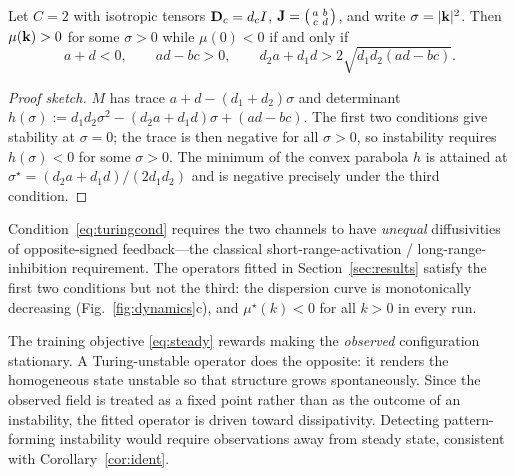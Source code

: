 \begin{proposition}
\label{prop:twochannel}
Let $C=2$ with isotropic tensors $\mathbf{D}_c = d_c I$, $\mathbf{J} = \begin{psmallmatrix}
a & b \\ c & d\end{psmallmatrix}$, and write $\sigma=|\mathbf{k}|^2$. Then
$\mu(\mathbf{k})>0$ for some $\sigma>0$ while $\mu(0)<0$ if and only if
\begin{equation}
a+d<0, \qquad ad-bc>0, \qquad d_2 a + d_1 d > 2\sqrt{d_1 d_2 (ad-bc)} .
\label{eq:turingcond}
\end{equation}
\end{proposition}

\begin{proof}[Proof sketch]
$M$ has trace $a+d-(d_1+d_2)\sigma$ and determinant
$h(\sigma) := d_1d_2\sigma^2 - (d_2a+d_1d)\sigma + (ad-bc)$. The first two
conditions give stability at $\sigma=0$; the trace is then negative for all
$\sigma>0$, so instability requires $h(\sigma)<0$ for some $\sigma>0$. The
minimum of the convex parabola $h$ is attained at
$\sigma^\star=(d_2a+d_1d)/(2d_1d_2)$ and is negative precisely under the third
condition.
\end{proof}

Condition~\eqref{eq:turingcond} requires the two channels to have
\emph{unequal} diffusivities of opposite-signed feedback---the classical
short-range-activation / long-range-inhibition requirement. The operators fitted
in Section~\ref{sec:results} satisfy the first two conditions but not the third:
the dispersion curve is monotonically decreasing
(Fig.~\ref{fig:dynamics}c), and $\mu^\star(k)<0$ for all $k>0$ in every run.

\begin{remark}
The training objective \eqref{eq:steady} rewards making the \emph{observed}
configuration stationary. A Turing-unstable operator does the opposite: it
renders the homogeneous state unstable so that structure grows spontaneously.
Since the observed field is treated as a fixed point rather than as the outcome
of an instability, the fitted operator is driven toward dissipativity. Detecting
pattern-forming instability would require observations away from steady state,
consistent with Corollary~\ref{cor:ident}.
\end{remark}

